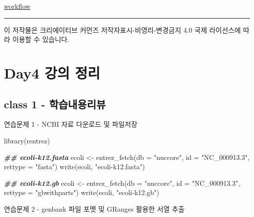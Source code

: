 \documentclass[
]{book}
\newenvironment{Shaded}{\begin{snugshade}}{\end{snugshade}}
\newcommand{\AttributeTok}[1]{\textcolor[rgb]{0.77,0.63,0.00}{#1}}
\newcommand{\DocumentationTok}[1]{\textcolor[rgb]{0.56,0.35,0.01}{\textbf{\textit{#1}}}}
\newcommand{\FunctionTok}[1]{\textcolor[rgb]{0.00,0.00,0.00}{#1}}
\newcommand{\NormalTok}[1]{#1}
\newcommand{\OtherTok}[1]{\textcolor[rgb]{0.56,0.35,0.01}{#1}}
\newcommand{\StringTok}[1]{\textcolor[rgb]{0.31,0.60,0.02}{#1}}
\begin{document}
\href{http://bioconductor.org/packages/release/BiocViews.html\#___Workflow}{workflow}

\begin{center}\rule{0.5\linewidth}{0.5pt}\end{center}

이 저작물은 크리에이티브 커먼즈 저작자표시-비영리-변경금지 4.0 국제 라이선스에 따라 이용할 수 있습니다.

\hypertarget{day4-uxac15uxc758-uxc815uxb9ac}{%
\chapter{Day4 강의 정리}\label{day4-uxac15uxc758-uxc815uxb9ac}}

\hypertarget{class-1---uxd559uxc2b5uxb0b4uxc6a9uxb9acuxbdf0}{%
\section{class 1 - 학습내용리뷰}\label{class-1---uxd559uxc2b5uxb0b4uxc6a9uxb9acuxbdf0}}

연습문제 1 - NCBI 자료 다운로드 및 파일저장

\begin{Shaded}
\begin{Highlighting}[]
\FunctionTok{library}\NormalTok{(rentrez)}

\DocumentationTok{\#\# ecoli{-}k12.fasta}
\NormalTok{ecoli }\OtherTok{\textless{}{-}} \FunctionTok{entrez\_fetch}\NormalTok{(}\AttributeTok{db =} \StringTok{"nuccore"}\NormalTok{, }
                      \AttributeTok{id =} \StringTok{"NC\_000913.3"}\NormalTok{,}
                      \AttributeTok{rettype =} \StringTok{"fasta"}\NormalTok{)}
\FunctionTok{write}\NormalTok{(ecoli, }\StringTok{"ecoli{-}k12.fasta"}\NormalTok{)}


\DocumentationTok{\#\# ecoli{-}k12.gb}
\NormalTok{ecoli }\OtherTok{\textless{}{-}} \FunctionTok{entrez\_fetch}\NormalTok{(}\AttributeTok{db =} \StringTok{"nuccore"}\NormalTok{, }
                      \AttributeTok{id =} \StringTok{"NC\_000913.3"}\NormalTok{,}
                      \AttributeTok{rettype =} \StringTok{"gbwithparts"}\NormalTok{)}
\FunctionTok{write}\NormalTok{(ecoli, }\StringTok{"ecoli{-}k12.gb"}\NormalTok{)}
\end{Highlighting}
\end{Shaded}

연습문제 2 - genbank 파일 포멧 및 GRanges 활용한 서열 추출
\end{document}
